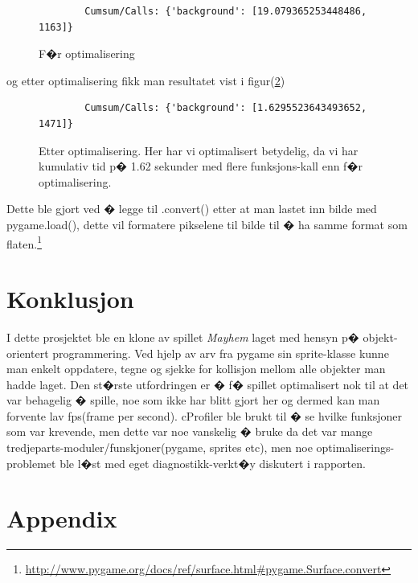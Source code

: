 {\begin{figure}[hbt!]
    \begin{lstlisting}
        Cumsum/Calls: {'background': [19.079365253448486, 1163]}
    \end{lstlisting}
\caption{F�r optimalisering}
\label{Kode2}
\end{figure}
og etter optimalisering fikk man resultatet vist i figur(\ref{Kode3})

\begin{figure}[hbt!]
    \begin{lstlisting}
        Cumsum/Calls: {'background': [1.6295523643493652, 1471]}
    \end{lstlisting}
\caption{Etter optimalisering. Her har vi optimalisert betydelig, da vi har kumulativ tid p� 1.62 sekunder med flere funksjons-kall enn f�r optimalisering.}
\label{Kode3}
\end{figure}

Dette ble gjort ved � legge til .convert() etter at man lastet inn bilde med pygame.load(), dette vil formatere pikselene til bilde til � ha samme format som flaten.\footnote{\url{http://www.pygame.org/docs/ref/surface.html\#pygame.Surface.convert}}

    \section{Konklusjon}

    I dette prosjektet ble en klone av spillet \emph{Mayhem} laget med hensyn p� objekt-orientert programmering. Ved hjelp av arv fra pygame sin sprite-klasse kunne man enkelt oppdatere, tegne og sjekke for kollisjon mellom alle objekter man hadde laget. Den st�rste utfordringen er � f� spillet optimalisert nok til at det var behagelig � spille, noe som ikke har blitt gjort her og dermed kan man forvente lav fps(frame per second). cProfiler ble brukt til � se hvilke funksjoner som var krevende, men dette var noe vanskelig � bruke da det var mange tredjeparts-moduler/funskjoner(pygame, sprites etc), men noe optimaliserings-problemet ble l�st med eget diagnostikk-verkt�y diskutert i rapporten.




\clearpage
\newpage
\section{Appendix}
}
